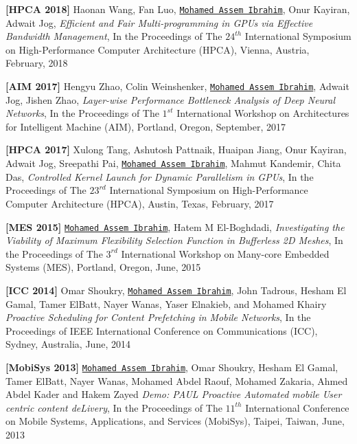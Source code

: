 \documentclass[10pt,a4]{article}
\begin{document}
\begin{description}

\item 
{\bf [HPCA 2018]}
Haonan Wang, Fan Luo, {\tt \underline{Mohamed Assem Ibrahim}}, Onur Kayiran, Adwait Jog, 
{\it Efficient and Fair Multi-programming in GPUs via Effective Bandwidth Management},
In the Proceedings of The $24^{th}$ International Symposium on High-Performance Computer Architecture (HPCA), 
Vienna, Austria, February, 2018

\item 
{\bf [AIM 2017]}
Hengyu Zhao, Colin Weinshenker, {\tt \underline{Mohamed Assem Ibrahim}}, Adwait Jog, Jishen Zhao,
{\it Layer-wise Performance Bottleneck Analysis of Deep Neural Networks},
In the Proceedings of The $1^{st}$ International Workshop on Architectures for Intelligent Machine (AIM), 
Portland, Oregon, September, 2017

\item 
{\bf [HPCA 2017]}
Xulong Tang, Ashutosh Pattnaik, Huaipan Jiang, Onur Kayiran, Adwait Jog, Sreepathi Pai, {\tt \underline{Mohamed Assem Ibrahim}}, Mahmut Kandemir, Chita Das, 
{\it Controlled Kernel Launch for Dynamic Parallelism in GPUs},
In the Proceedings of The $23^{rd}$ International Symposium on High-Performance Computer Architecture (HPCA), 
Austin, Texas, February, 2017

\item 
{\bf [MES 2015]}
{\tt \underline{Mohamed Assem Ibrahim}}, Hatem M El-Boghdadi,
{\it Investigating the Viability of Maximum Flexibility Selection Function in Bufferless 2D Meshes},
In the Proceedings of The $3^{rd}$ International Workshop on Many-core Embedded Systems (MES), 
Portland, Oregon, June, 2015

\item
{\bf [ICC 2014]} 
Omar Shoukry, {\tt \underline{Mohamed Assem Ibrahim}}, John Tadrous, Hesham El Gamal, Tamer ElBatt, Nayer Wanas, Yaser Elnakieb, and Mohamed Khairy 
{\it Proactive Scheduling for Content Pre­fetching in Mobile Networks}, 
In the Proceedings of IEEE International Conference on Communications (ICC),
Sydney, Australia, June, 2014

\item
{\bf [MobiSys 2013]} 
{\tt \underline{Mohamed Assem Ibrahim}}, Omar Shoukry, Hesham El Gamal, Tamer ElBatt, Nayer Wanas, Mohamed Abdel Raouf, Mohamed Zakaria, Ahmed Abdel Kader and Hakem Zayed 
{\it Demo: PAUL­ Proactive Automated mobile User centric content deLivery}, 
In the Proceedings of The $11^{th}$ International Conference on Mobile Systems, Applications, and Services (MobiSys), 
Taipei, Taiwan, June, 2013

\end{description}
\end{document}
